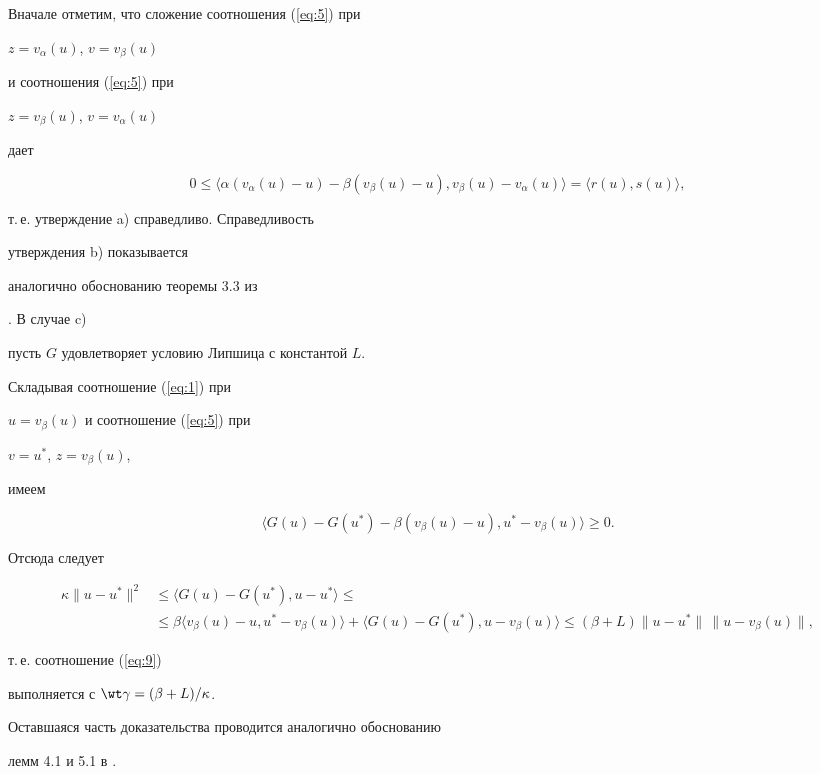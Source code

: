 \begin{pf}


Вначале отметим, что сложение соотношения (\ref{eq:5}) при


$z=v_{\alpha }(u)$, $ v= v_{\beta }(u)$


и соотношения (\ref{eq:5}) при 


$z=v_{\beta }(u)$, $ v= v_{\alpha }(u)$


дает


$$


0 \leq \langle \alpha (v_{\alpha }(u)-u) -


\beta (v_{\beta}(u)-u), v_{\beta }(u) - v_{\alpha }(u) \rangle =


\langle r(u), s(u) \rangle ,


$$


т.\,е. утверждение a) справедливо. Справедливость


утверждения b) показывается 


аналогично обоснованию теоремы 3.3 из


\cite{YTF97}. В случае c)


пусть $G$ удовлетворяет условию Липшица с константой $L$.


Складывая соотношение (\ref{eq:1}) при 


$u=v_{\beta }(u)$ и соотношение (\ref{eq:5}) при


$v=u^{*}$, $z=v_{\beta }(u)$,


имеем


$$


\langle G(u) - G(u^{*}) - \beta ( v_{\beta }(u) -u),


u^{*}- v_{\beta }(u) \rangle \geq 0.


$$


Отсюда следует 


\begin{align*}


\kappa \| u - u^{*} \|^{2} & \leq 


\langle G(u)- G(u^{*}), u - u^{*}\rangle \le \\


& \leq \beta


\langle v_{\beta }(u)- u, u^{*}- v_{\beta }(u) \rangle +


\langle G(u)- G(u^{*}), u- v_{\beta }(u) \rangle \le


(\beta + L ) \|u-u^{*}\|\, \| u- v_{\beta }(u)\|,


\end{align*}


т.\,е. соотношение (\ref{eq:9})


выполняется с $ \wt \gamma = (\beta + L )/ \kappa $.


Оставшаяся часть доказательства проводится аналогично обоснованию 


лемм 4.1 и 5.1 в \cite{YTF97}.


\end{pf}






